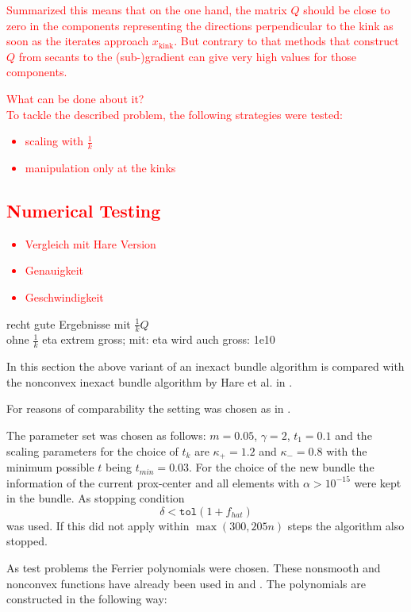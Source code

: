\textcolor{red}{Summarized this means that on the one hand, the matrix \(Q\) should be close to zero in the components representing the directions perpendicular to the kink as soon as the iterates approach \(x_{\text{kink}}\). But contrary to that methods that construct \(Q\) from secants to the (sub-)gradient can give very high values for those components.}

\textcolor{red}{What can be done about it?\\
To tackle the described problem, the following strategies were tested: 
\begin{itemize}
	\item scaling with \(\frac{1}{k}\)
	\item manipulation only at the kinks
\end{itemize}}

\subsection{\textcolor{red}{Numerical Testing}}

\textcolor{red}{
\begin{itemize}
	\item Vergleich mit Hare Version
	\item Genauigkeit
	\item Geschwindigkeit
\end{itemize}}

recht gute Ergebnisse mit \(\frac{1}{k}Q\)\\
ohne \(\frac{1}{k}\) eta extrem gross; mit: eta wird auch gross: 1e10

In this section the above variant of an inexact bundle algorithm is compared with the nonconvex inexact bundle algorithm by Hare et al. in \cite{Hare2016}.

For reasons of comparability the setting was chosen as in \cite{Hare2016}.

The parameter set was chosen as follows: \(m = 0.05\), \(\gamma = 2\), \(t_1 = 0.1\) and the scaling parameters for the choice of \(t_k\) are \(\kappa_{+}=1.2\) and \(\kappa_{-}=0.8\) with the minimum possible \(t\) being \(t_{min}=0.03\).
For the choice of the new bundle the information of the current prox-center and all elements with \(\alpha > 10^{-15}\) were kept in the bundle.
As stopping condition  
\[ \delta < \mathtt{tol}(1+f_{hat}) \]
was used.
If this did not apply within \(\max(300,205n)\) steps the algorithm also stopped.

As test problems the Ferrier polynomials were chosen. These nonsmooth and nonconvex functions have already been used in \cite{Hare2010} and \cite{Hare2016}. The polynomials are constructed in the following way:

